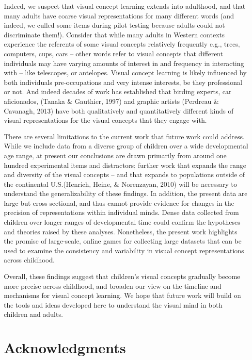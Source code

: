 \documentclass[
  man,mask]{apa6}
\begin{document}
Indeed, we suspect that visual concept learning extends into adulthood, and that many adults have coarse visual representations for many different words (and indeed, we culled some items during pilot testing because adults could not discriminate them!). Consider that while many adults in Western contexts experience the referents of some visual concepts relatively frequently e.g., trees, computers, cups, cars -- other words refer to visual concepts that different individuals may have varying amounts of interest in and frequency in interacting with -- like telescopes, or antelopes. Visual concept learning is likely influenced by both individuals pre-occupations and very intense interests, be they professional or not. And indeed decades of work has established that birding experts, car aficionados, (Tanaka \& Gauthier, 1997) and graphic artists (Perdreau \& Cavanagh, 2013) have both qualitatively and quantitatively different kinds of visual representations for the visual concepts that they engage with.

There are several limitations to the current work that future work could address. While we include data from a diverse group of children over a wide developmental age range, at present our conclusions are drawn primarily from around one hundred experimental items and distractors; further work that expands the range and diversity of the visual concepts -- and that expands to populations outside of the continental U.S.(Henrich, Heine, \& Norenzayan, 2010) will be necessary to understand the generalizability of these findings. In addition, the present data are large but cross-sectional, and thus cannot provide evidence for changes in the precision of representations within individual minds. Dense data collected from children over longer ranges of developmental time could confirm the hypotheses and theories raised by these analyses. Nonetheless, the present work highlights the promise of large-scale, online games for collecting large datasets that can be used to examine the consistency and variability in visual concept representations across childhood.

Overall, these findings suggest that children's visual concepts gradually become more precise across childhood, and broaden our view on the timeline and mechanisms for visual concept learning. We hope that future work will build on the tools and ideas developed here to understand the visual mind in both children and adults.

\newpage

\section{Acknowledgments}\label{acknowledgments}
\end{document}
